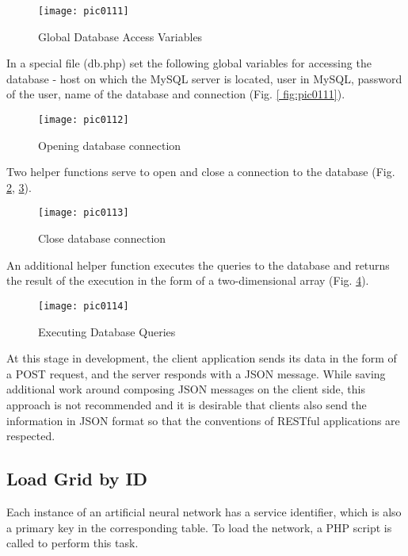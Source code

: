 \begin{figure}[h]
\centering
\texttt{[image: pic0111]}
\caption{Global Database Access Variables}
\label{fig:pic0111}
\end{figure}
\FloatBarrier

In a special file (db.php) set the following global variables for accessing the database - host on which the MySQL server is located, user in MySQL, password of the user, name of the database and connection (Fig. \ref{ fig:pic0111}).

\begin{figure}[h]
\centering
\texttt{[image: pic0112]}
\caption{Opening database connection}
\label{fig:pic0112}
\end{figure}
\FloatBarrier

Two helper functions serve to open and close a connection to the database (Fig. \ref{fig:pic0112}, \ref{fig:pic0113}).

\begin{figure}[h]
\centering
\texttt{[image: pic0113]}
\caption{Close database connection}
\label{fig:pic0113}
\end{figure}
\FloatBarrier

An additional helper function executes the queries to the database and returns the result of the execution in the form of a two-dimensional array (Fig. \ref{fig:pic0114}).

\begin{figure}[h]
\centering
\texttt{[image: pic0114]}
\caption{Executing Database Queries}
\label{fig:pic0114}
\end{figure}
\FloatBarrier

At this stage in development, the client application sends its data in the form of a POST request, and the server responds with a JSON message. While saving additional work around composing JSON messages on the client side, this approach is not recommended and it is desirable that clients also send the information in JSON format so that the conventions of RESTful applications are respected.

\subsection{Load Grid by ID}

Each instance of an artificial neural network has a service identifier, which is also a primary key in the corresponding table. To load the network, a PHP script is called to perform this task.

